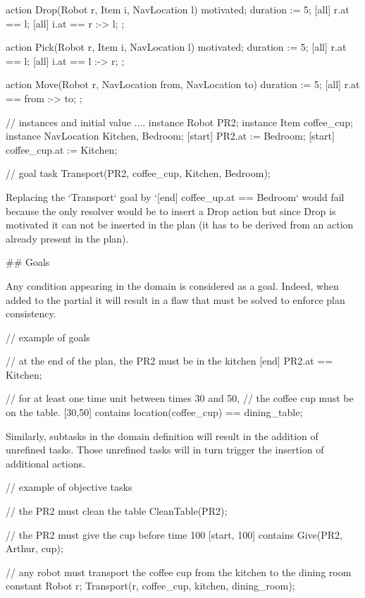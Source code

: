     action Drop(Robot r, Item i, NavLocation l) {
      motivated;
      duration := 5;
      [all] r.at == l;
      [all] i.at == r :-> l;
    };

    action Pick(Robot r, Item i, NavLocation l) {
      motivated;
      duration := 5;
      [all] r.at == l;
      [all] i.at == l :-> r;
    };

    action Move(Robot r, NavLocation from, NavLocation to) {
      duration := 5;
      [all] r.at == from :-> to;
    };

    // instances and initial value ....
    instance Robot PR2;
    instance Item coffee_cup;
    instance NavLocation Kitchen, Bedroom;
    [start] PR2.at := Bedroom;
    [start] coffee_cup.at := Kitchen;
    
    // goal task
    Transport(PR2, coffee_cup, Kitchen, Bedroom);

Replacing the `Transport` goal by `[end] coffee_up.at == Bedroom` would fail because
the only resolver would be to insert a Drop action but since Drop is motivated it can not be inserted in the plan (it has to be derived from an action already present in the plan).


## Goals

Any condition appearing in the domain is considered as a goal.
Indeed, when added to the partial it will result in a flaw that must be solved to enforce
plan consistency.

    // example of goals

    // at the end of the plan, the PR2 must be in the kitchen
    [end] PR2.at == Kitchen;

    // for at least one time unit between times 30 and 50,
    // the coffee cup must be on the table.
    [30,50] contains location(coffee_cup) == dining_table;


Similarly, subtasks in the domain definition will result in the
addition of unrefined tasks.  Those unrefined tasks will in turn
trigger the insertion of additional actions.

    // example of objective tasks
    
    // the PR2 must clean the table
    CleanTable(PR2);

    // the PR2 must give the cup before time 100
    [start, 100] contains Give(PR2, Arthur, cup);

    // any robot must transport the coffee cup from the kitchen to the dining room
    constant Robot r;
    Transport(r, coffee_cup, kitchen, dining_room);



